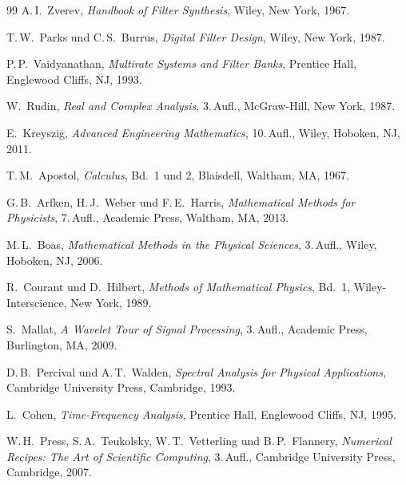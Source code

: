 ﻿\documentclass[a4paper,12pt]{report}
\theoremstyle{definition}
\begin{document}
\begin{thebibliography}{99}
A.\,I.~Zverev,
\textit{Handbook of Filter Synthesis},
Wiley, New York, 1967.

T.\,W.~Parks und C.\,S.~Burrus,
\textit{Digital Filter Design},
Wiley, New York, 1987.

P.\,P.~Vaidyanathan,
\textit{Multirate Systems and Filter Banks},
Prentice Hall, Englewood Cliffs, NJ, 1993.

W.~Rudin,
\textit{Real and Complex Analysis},
3.\,Aufl., McGraw-Hill, New York, 1987.

E.~Kreyszig,
\textit{Advanced Engineering Mathematics},
10.\,Aufl., Wiley, Hoboken, NJ, 2011.

T.\,M.~Apostol,
\textit{Calculus}, Bd.~1 und 2,
Blaisdell, Waltham, MA, 1967.

G.\,B.~Arfken, H.\,J.~Weber und F.\,E.~Harris,
\textit{Mathematical Methods for Physicists},
7.\,Aufl., Academic Press, Waltham, MA, 2013.

M.\,L.~Boas,
\textit{Mathematical Methods in the Physical Sciences},
3.\,Aufl., Wiley, Hoboken, NJ, 2006.

R.~Courant und D.~Hilbert,
\textit{Methods of Mathematical Physics}, Bd.~1,
Wiley-Interscience, New York, 1989.

S.~Mallat,
\textit{A Wavelet Tour of Signal Processing},
3.\,Aufl., Academic Press, Burlington, MA, 2009.

D.\,B.~Percival und A.\,T.~Walden,
\textit{Spectral Analysis for Physical Applications},
Cambridge University Press, Cambridge, 1993.

L.~Cohen,
\textit{Time-Frequency Analysis},
Prentice Hall, Englewood Cliffs, NJ, 1995.

W.\,H.~Press, S.\,A.~Teukolsky, W.\,T.~Vetterling und B.\,P.~Flannery,
\textit{Numerical Recipes: The Art of Scientific Computing},
3.\,Aufl., Cambridge University Press, Cambridge, 2007.


\end{thebibliography}
\end{document}
